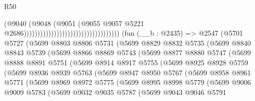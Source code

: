 \begin{lexlean}{R50}
\begin{coremodule}
                                                                  (@9040
                                                                    (@9048
                                                                      (@9051
                                                                        (@9055
                                                                          @9057
                                                                          @5221
                                                                          @2686)))))))))))))))))))))))))))))))))))
    (fun (__b : @2435) =>
    @2547
      (@5701
        @5727
        (@5699
          @8803
          @8806
          @5731
          (@5699
            @8829
            @8832
            @5735
            (@5699
              @8840
              @8843
              @5739
              (@5699
                @8866
                @8869
                @5743
                (@5699
                  @8877
                  @8880
                  @5747
                  (@5699
                    @8888
                    @8891
                    @5751
                    (@5699
                      @8914
                      @8917
                      @5755
                      (@5699
                        @8925
                        @8928
                        @5759
                        (@5699
                          @8936
                          @8939
                          @5763
                          (@5699
                            @8947
                            @8950
                            @5767
                            (@5699
                              @8958
                              @8961
                              @5771
                              (@5699
                                @8969
                                @8972
                                @5775
                                (@5699
                                  @8995
                                  @8998
                                  @5779
                                  (@5699
                                    @9006
                                    @9009
                                    @5783
                                    (@5699
                                      @9032
                                      @9035
                                      @5787
                                      (@5699
                                        @9043
                                        @9046
                                        @5791

\end{coremodule}
\end{lexlean}
